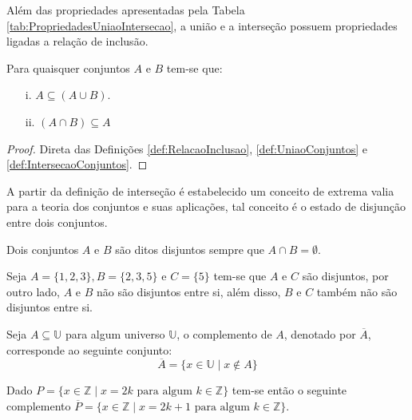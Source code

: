 Além das propriedades apresentadas pela Tabela \ref{tab:PropriedadesUniaoIntersecao}, a união e a interseção possuem propriedades ligadas a relação de inclusão.

\begin{theorem}\label{teo:MonotonicidadeDaUniaoIntersecao}
	Para quaisquer conjuntos $A$ e $B$ tem-se que:
	\begin{itemize}
		\item[i.] $A \subseteq (A \cup B)$.
		\item[ii.] $(A \cap B) \subseteq A$
	\end{itemize}
\end{theorem}

\begin{proof}
	Direta das Definições \ref{def:RelacaoInclusao}, \ref{def:UniaoConjuntos} e \ref{def:IntersecaoConjuntos}.
\end{proof}

A partir da definição de interseção é estabelecido um conceito de extrema valia para a teoria dos conjuntos e suas aplicações, tal conceito é o estado de disjunção entre dois conjuntos.

\begin{definition}\label{def:ConjuntosDisjuntos}
	Dois conjuntos $A$ e $B$ são ditos disjuntos sempre que $A \cap B = \emptyset$.
\end{definition}

\begin{example}\label{exe:ConjuntosDisjuntos}
	Seja $A = \{1, 2, 3\}, B = \{2, 3, 5\}$ e $C = \{5\}$ tem-se que $A$ e $C$ são disjuntos, por outro lado, $A$ e $B$ não são disjuntos entre si, além disso, $B$ e $C$ também não são disjuntos entre si.
\end{example}

\begin{definition}\label{def:ComplementoConjuntos}
	Seja $A \subseteq \mathbb{U}$ para algum universo $\mathbb{U}$, o complemento de $A$, denotado por $\overline{A}$, corresponde ao seguinte conjunto:
	$$\overline{A} = \{x \in \mathbb{U} \mid x \notin A\}$$
\end{definition}

\begin{example}\label{exe:Complemento}
	Dado $P = \{ x \in \mathbb{Z} \mid x = 2k \mbox{ para algum } k \in \mathbb{Z}\}$ tem-se então o seguinte complemento $\overline{P} = \{ x \in \mathbb{Z} \mid x = 2k + 1 \mbox{ para algum } k \in \mathbb{Z}\}$.
\end{example}

